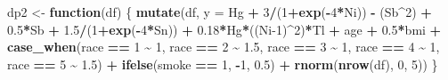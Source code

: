 \documentclass[12pt, twoside]{amherstthesis}
\newenvironment{Shaded}{\begin{snugshade}}{\end{snugshade}}
\newcommand{\AttributeTok}[1]{\textcolor[rgb]{0.13,0.29,0.53}{#1}}
\newcommand{\ControlFlowTok}[1]{\textcolor[rgb]{0.13,0.29,0.53}{\textbf{#1}}}
\newcommand{\DecValTok}[1]{\textcolor[rgb]{0.00,0.00,0.81}{#1}}
\newcommand{\FloatTok}[1]{\textcolor[rgb]{0.00,0.00,0.81}{#1}}
\newcommand{\FunctionTok}[1]{\textcolor[rgb]{0.13,0.29,0.53}{\textbf{#1}}}
\newcommand{\NormalTok}[1]{#1}
\newcommand{\OtherTok}[1]{\textcolor[rgb]{0.56,0.35,0.01}{#1}}
\newcommand{\SpecialCharTok}[1]{\textcolor[rgb]{0.81,0.36,0.00}{\textbf{#1}}}
\begin{document}
\begin{Shaded}
\begin{Highlighting}[]
\NormalTok{dp2 }\OtherTok{\textless{}{-}} \ControlFlowTok{function}\NormalTok{(df) \{}
  \FunctionTok{mutate}\NormalTok{(df, }\AttributeTok{y =} 
\NormalTok{           Hg }\SpecialCharTok{+} \DecValTok{3}\SpecialCharTok{/}\NormalTok{(}\DecValTok{1}\SpecialCharTok{+}\FunctionTok{exp}\NormalTok{(}\SpecialCharTok{{-}}\DecValTok{4}\SpecialCharTok{*}\NormalTok{Ni)) }\SpecialCharTok{{-}}\NormalTok{ (Sb}\SpecialCharTok{\^{}}\DecValTok{2}\NormalTok{) }\SpecialCharTok{+} \FloatTok{0.5}\SpecialCharTok{*}\NormalTok{Sb }\SpecialCharTok{+} \FloatTok{1.5}\SpecialCharTok{/}\NormalTok{(}\DecValTok{1}\SpecialCharTok{+}\FunctionTok{exp}\NormalTok{(}\SpecialCharTok{{-}}\DecValTok{4}\SpecialCharTok{*}\NormalTok{Sn)) }\SpecialCharTok{+} 
           \FloatTok{0.18}\SpecialCharTok{*}\NormalTok{Hg}\SpecialCharTok{*}\NormalTok{((Ni}\DecValTok{{-}1}\NormalTok{)}\SpecialCharTok{\^{}}\DecValTok{2}\NormalTok{)}\SpecialCharTok{*}\NormalTok{Tl }\SpecialCharTok{+}
\NormalTok{           age }\SpecialCharTok{+} \FloatTok{0.5}\SpecialCharTok{*}\NormalTok{bmi }\SpecialCharTok{+} 
           \FunctionTok{case\_when}\NormalTok{(race }\SpecialCharTok{==} \DecValTok{1} \SpecialCharTok{\textasciitilde{}} \DecValTok{1}\NormalTok{, }
\NormalTok{                     race }\SpecialCharTok{==} \DecValTok{2} \SpecialCharTok{\textasciitilde{}} \FloatTok{1.5}\NormalTok{, }
\NormalTok{                     race }\SpecialCharTok{==} \DecValTok{3} \SpecialCharTok{\textasciitilde{}} \DecValTok{1}\NormalTok{, }
\NormalTok{                     race }\SpecialCharTok{==} \DecValTok{4} \SpecialCharTok{\textasciitilde{}} \DecValTok{1}\NormalTok{, }
\NormalTok{                     race }\SpecialCharTok{==} \DecValTok{5} \SpecialCharTok{\textasciitilde{}} \FloatTok{1.5}\NormalTok{) }\SpecialCharTok{+}
           \FunctionTok{ifelse}\NormalTok{(smoke }\SpecialCharTok{==} \DecValTok{1}\NormalTok{, }\SpecialCharTok{{-}}\DecValTok{1}\NormalTok{, }\FloatTok{0.5}\NormalTok{) }\SpecialCharTok{+}
           \FunctionTok{rnorm}\NormalTok{(}\FunctionTok{nrow}\NormalTok{(df), }\DecValTok{0}\NormalTok{, }\DecValTok{5}\NormalTok{))}
\NormalTok{\}}
\end{Highlighting}
\end{Shaded}
\normalsize
\end{document}
